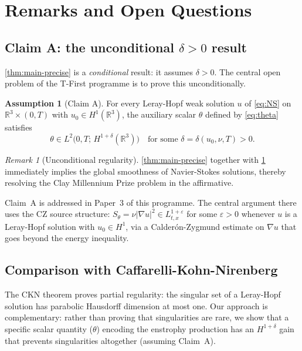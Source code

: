 \documentclass[12pt]{article}
\theoremstyle{plain}
\theoremstyle{definition}
\newtheorem{assumption}[theorem]{Assumption}
\theoremstyle{remark}
\newtheorem{remark}[theorem]{Remark}
\newcommand{\R}{\mathbb{R}}
\newcommand{\abs}[1]{\left|#1\right|}
\newcommand{\eps}{\varepsilon}
\newcommand{\grad}{\nabla}
\begin{document}
\section{Remarks and Open Questions}\label{sec:remarks}

\subsection{Claim A: the unconditional $\delta>0$ result}

\cref{thm:main-precise} is a \emph{conditional} result: it assumes $\delta>0$.
The central open problem of the T-First programme is to prove this unconditionally.

\begin{assumption}[Claim A]\label{ass:claimA}
  For every Leray-Hopf weak solution $u$ of \eqref{eq:NS} on $\R^3\times(0,T)$
  with $u_0\in H^1(\R^3)$, the auxiliary scalar $\theta$ defined by \eqref{eq:theta}
  satisfies
  \[
    \theta\in L^2\bigl(0,T;\,H^{1+\delta}(\R^3)\bigr)
    \quad\text{for some }\delta=\delta(u_0,\nu,T)>0.
  \]
\end{assumption}

\begin{remark}[Unconditional regularity]
  \cref{thm:main-precise} together with \cref{ass:claimA} immediately implies
  the global smoothness of Navier-Stokes solutions, thereby resolving the
  Clay Millennium Prize problem in the affirmative.
\end{remark}

Claim~A is addressed in Paper~3 \cite{TFirstPaper3} of this programme.
The central argument there uses the CZ source structure:
$S_\theta=\nu\abs{\grad u}^2\in L^{1+\eps}_{t,x}$ for some $\eps>0$
whenever $u$ is a Leray-Hopf solution with $u_0\in H^1$,
via a Calderón-Zygmund estimate on $\grad u$ that goes beyond the energy inequality.

\subsection{Comparison with Caffarelli-Kohn-Nirenberg}

The CKN theorem \cite{CKN1982} proves partial regularity: the singular set of
a Leray-Hopf solution has parabolic Hausdorff dimension at most one.
Our approach is complementary: rather than proving that singularities are rare,
we show that a specific scalar quantity ($\theta$) encoding the enstrophy
production has an $H^{1+\delta}$ gain that prevents singularities altogether
(assuming Claim~A).
\end{document}

